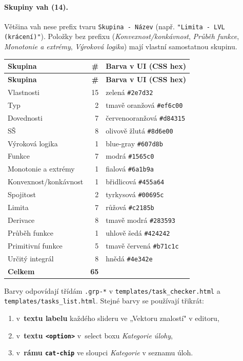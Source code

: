 \documentclass[11pt,a4paper]{article}
\begin{document}
\paragraph{Skupiny vah (14).} Většina vah nese prefix tvaru \texttt{Skupina - Název} (např. \texttt{"Limita - LVL (krácení)"}). Položky bez prefixu (\emph{Konvexnost/konkávnost}, \emph{Průběh funkce}, \emph{Monotonie a extrémy}, \emph{Výroková logika}) mají vlastní samostatnou skupinu.

\begin{longtable}{p{4cm}rp{9.5cm}}
  \toprule
  \textbf{Skupina} & \textbf{\#} & \textbf{Barva v UI (CSS hex)} \\
  \midrule
  \endfirsthead
  \toprule
  \textbf{Skupina} & \textbf{\#} & \textbf{Barva v UI (CSS hex)} \\
  \midrule
  \endhead
  Vlastnosti              & 15 & zelená \texttt{\#2e7d32} \\
  Typ                     & 2 & tmavě oranžová \texttt{\#ef6c00} \\
  Dovednosti              & 7 & červenooranžová \texttt{\#d84315} \\
  SŠ                      & 8 & olivově žlutá \texttt{\#8d6e00} \\
  Výroková logika         & 1 & blue-gray \texttt{\#607d8b} \\
  Funkce                  & 7 & modrá \texttt{\#1565c0} \\
  Monotonie a extrémy     & 1 & fialová \texttt{\#6a1b9a} \\
  Konvexnost/konkávnost   & 1 & břidlicová \texttt{\#455a64} \\
  Spojitost               & 2 & tyrkysová \texttt{\#00695c} \\
  Limita                  & 7 & růžová \texttt{\#c2185b} \\
  Derivace                & 8 & tmavě modrá \texttt{\#283593} \\
  Průběh funkce           & 1 & uhlově šedá \texttt{\#424242} \\
  Primitivní funkce       & 5 & tmavě červená \texttt{\#b71c1c} \\
  Určitý integrál         & 8 & hnědá \texttt{\#4e342e} \\
  \midrule
  \textbf{Celkem}         & \textbf{65} & \\
  \bottomrule
\end{longtable}

Barvy odpovídají třídám \texttt{.grp-*} v \texttt{templates/task\_checker.html} a \texttt{templates/tasks\_list.html}. Stejné barvy se používají třikrát:
\begin{enumerate}
  \item v~\textbf{textu labelu} každého slideru ve „Vektoru znalostí" v editoru,
  \item v~\textbf{textu \texttt{<option>}} v~select boxu \emph{Kategorie úlohy},
  \item v~\textbf{rámu \texttt{cat-chip}} ve sloupci \emph{Kategorie} v seznamu úloh.
\end{enumerate}
\end{document}
